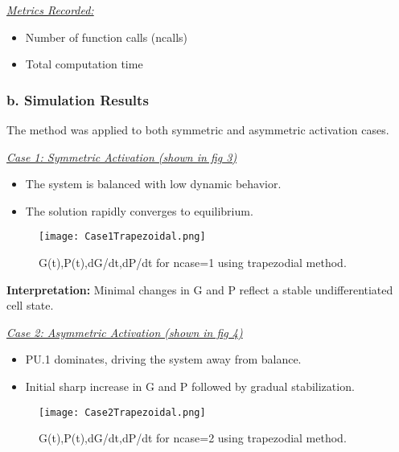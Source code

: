 \documentclass[journal]{IEEEtran}
\begin{document}
\underline{\textit{Metrics Recorded:}}
\begin{itemize}
    \item Number of function calls (ncalls)
    \item Total computation time
\end{itemize}
\vspace{1em}

\subsubsection*{\textbf{b. Simulation Results}} \hfill 

The method was applied to both symmetric and asymmetric activation cases.

\underline{\textit{Case 1: Symmetric Activation (shown in fig 3)}}
\begin{itemize}
    \item The system is balanced with low dynamic behavior.
    \item The solution rapidly converges to equilibrium.
\end{itemize}
\begin{figure}[H]%
\begin {center}
\texttt{[image: Case1Trapezoidal.png]}
\caption{ G(t),P(t),dG/dt,dP/dt for  ncase=1 using trapezodial method. }
\label{fig:ecg}
\end {center}
\end{figure}

\textbf{Interpretation:} Minimal changes in G and P reflect a stable undifferentiated cell state.

\vspace{1em}

\underline{\textit{Case 2: Asymmetric Activation (shown in fig 4)}}
\begin{itemize}
    \item PU.1 dominates, driving the system away from balance.
    \item Initial sharp increase in G and P followed by gradual stabilization.
\end{itemize}

\begin{figure}[H]%
\begin {center}
\texttt{[image: Case2Trapezoidal.png]}
\caption{ G(t),P(t),dG/dt,dP/dt for  ncase=2 using trapezodial method. }
\label{fig:ecg}
\end {center}
\end{figure}
\end{document}
